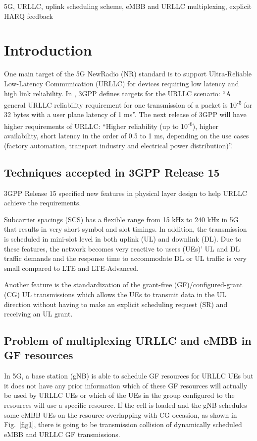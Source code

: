 \documentclass[conference]{IEEEtran}
\begin{document}
\begin{IEEEkeywords}
5G, URLLC, uplink scheduling scheme, eMBB and URLLC multiplexing, explicit HARQ feedback
\end{IEEEkeywords}

\section{Introduction} \label{I}
One main target of the 5G NewRadio (NR) standard is to support Ultra-Reliable Low-Latency Communication (URLLC) for devices requiring low latency and high link reliability. In \cite{b6}, 3GPP defines targets for the URLLC scenario: ``A general URLLC reliability requirement for one transmission of a packet is 10\textsuperscript{-5} for 32 bytes with a user plane latency of 1 ms''. The next release of 3GPP will have higher requirements of URLLC: ``Higher reliability (up to 10\textsuperscript{-6}), higher availability, short latency in the order of 0.5 to 1 ms, depending on the use cases (factory automation, transport industry and electrical power distribution)''\cite{b8}.

\subsection{Techniques accepted in 3GPP Release 15}\label{IAA}
3GPP Release 15 specified new features in physical layer design to help URLLC achieve the requirements.

Subcarrier spacings (SCS) has a flexible range from 15 kHz to 240 kHz in 5G that results in very short symbol and slot timings\cite{ad2}. In addition, the transmission is scheduled in  mini-slot level in both uplink (UL) and downlink (DL)\cite{ad3}. Due to these features, the network becomes very reactive to users (UEs)' UL and DL traffic demands and the response time to accommodate DL or UL traffic is very small compared to LTE and LTE-Advanced.

Another feature is the standardization of the grant-free (GF)/configured-grant (CG) UL transmissions which allows the UEs to transmit data in the UL direction without having to make an explicit scheduling request (SR) and receiving an UL grant\cite{ad4}.

\subsection{Problem of multiplexing URLLC and eMBB in GF resources}\label{IBB}
In 5G, a base station (gNB) is able to schedule GF resources for URLLC UEs but it does not have any prior information which of these GF resources will actually be used by URLLC UEs or which of the UEs in the group configured to the resources will use a specific resource. If the cell is loaded and the gNB schedules some eMBB UEs on the resource overlapping with CG occasion, as shown in Fig.~\ref{fig1}, there is going to be transmission collision of dynamically scheduled eMBB and URLLC GF transmissions. 
\end{document}
